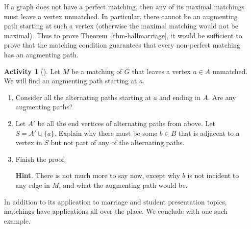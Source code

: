 \documentclass[10pt,]{book}
\theoremstyle{plain}
\theoremstyle{definition}
\theoremstyle{definition}
\theoremstyle{definition}
\newtheorem{activity}[project]{Activity}
\numberwithin{equation}{chapter}
\begin{document}
\hypertarget{p-453}{}%
If a graph does not have a perfect matching, then any of its maximal matchings must leave a vertex unmatched.  In particular, there cannot be an augmenting path starting at such a vertex (otherwise the maximal matching would not be maximal).  Thus to prove \hyperref[thm-hallmarriage]{Theorem~\ref{thm-hallmarriage}}, it would be sufficient to prove that the matching condition guarantees that every non-perfect matching has an augmenting path.%
\begin{activity}[]\label{activity-53}
\hypertarget{p-454}{}%
Let \(M\) be a matching of \(G\) that leaves a vertex \(a \in A\) unmatched.  We will find an augmenting path starting at \(a\).%
\begin{enumerate}[font=\bfseries,label=(\alph*),ref=\alph*]
\item\label{task-63} \hypertarget{p-455}{}%
Consider all the alternating paths starting at \(a\) and ending in \(A\).  Are any augmenting paths?%
\item\label{task-64} \hypertarget{p-456}{}%
Let \(A'\) be all the end vertices of alternating paths from above.  Let \(S = A' \cup \{a\}\).  Explain why there must be some \(b \in B\) that is adjacent to a vertex in \(S\) but not part of any of the alternating paths.%
\item\label{task-65} \hypertarget{p-457}{}%
Finish the proof.%
\par\smallskip%
\noindent\textbf{Hint}.\hypertarget{hint-24}{}\quad%
\hypertarget{p-458}{}%
There is not much more to say now, except why \(b\) is not incident to any edge in \(M\), and what the augmenting path would be.%
\end{enumerate}
\end{activity}
\hypertarget{p-459}{}%
In addition to its application to marriage and student presentation topics, matchings have applications all over the place. We conclude with one such example.%
\end{document}
